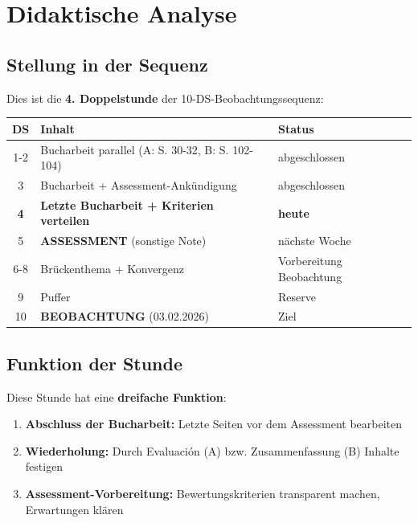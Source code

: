 \documentclass[11pt, a4paper]{article}
\begin{document}
\section{Didaktische Analyse}

\subsection{Stellung in der Sequenz}

Dies ist die \textbf{4. Doppelstunde} der 10-DS-Beobachtungssequenz:

\begin{center}
\begin{tabular}{|c|l|l|}
    \hline
    \textbf{DS} & \textbf{Inhalt} & \textbf{Status} \\
    \hline
    1-2 & Bucharbeit parallel (A: S. 30-32, B: S. 102-104) & abgeschlossen \\
    3 & Bucharbeit + Assessment-Ankündigung & abgeschlossen \\
    \rowcolor{hellgrau}
    \textbf{4} & \textbf{Letzte Bucharbeit + Kriterien verteilen} & \textbf{heute} \\
    5 & \textbf{ASSESSMENT} (sonstige Note) & nächste Woche \\
    6-8 & Brückenthema + Konvergenz & Vorbereitung Beobachtung \\
    9 & Puffer & Reserve \\
    10 & \textbf{BEOBACHTUNG} (03.02.2026) & Ziel \\
    \hline
\end{tabular}
\end{center}

\subsection{Funktion der Stunde}

Diese Stunde hat eine \textbf{dreifache Funktion}:

\begin{enumerate}[leftmargin=2em]
    \item \textbf{Abschluss der Bucharbeit:} Letzte Seiten vor dem Assessment bearbeiten
    \item \textbf{Wiederholung:} Durch Evaluación (A) bzw. Zusammenfassung (B) Inhalte festigen
    \item \textbf{Assessment-Vorbereitung:} Bewertungskriterien transparent machen, Erwartungen klären
\end{enumerate}
\end{document}
